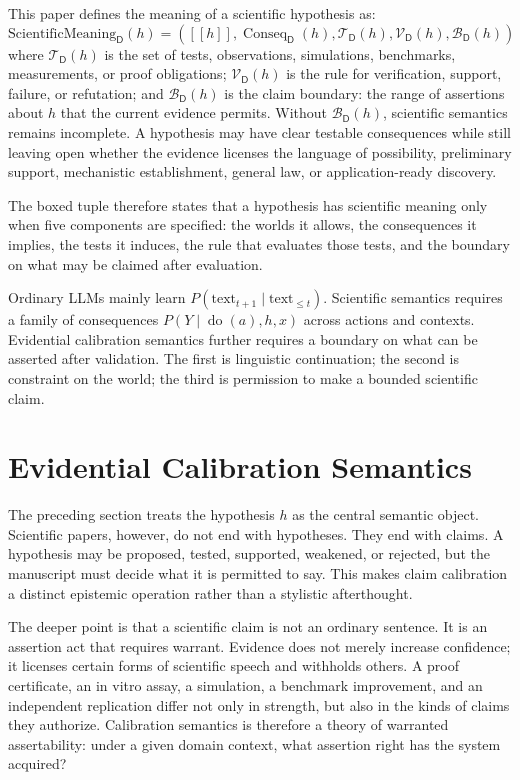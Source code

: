 \documentclass[11pt,a4paper]{article}
\newcommand{\doop}{\operatorname{do}}
\newcommand{\Conseq}{\operatorname{Conseq}}
\newcommand{\denote}[1]{\left[\!\left[#1\right]\!\right]}
\newcommand{\Dom}{\mathsf{D}}
\begin{document}
This paper defines the meaning of a scientific hypothesis as:
\begin{equation}
\boxed{
\mathrm{ScientificMeaning}_{\Dom}(h)=
\left(
\denote{h},
\Conseq_{\Dom}(h),
\mathcal{T}_{\Dom}(h),
\mathcal{V}_{\Dom}(h),
\mathcal{B}_{\Dom}(h)
\right)
}
\end{equation}
where $\mathcal{T}_{\Dom}(h)$ is the set of tests, observations, simulations, benchmarks, measurements, or proof obligations; $\mathcal{V}_{\Dom}(h)$ is the rule for verification, support, failure, or refutation; and $\mathcal{B}_{\Dom}(h)$ is the claim boundary: the range of assertions about $h$ that the current evidence permits. Without $\mathcal{B}_{\Dom}(h)$, scientific semantics remains incomplete. A hypothesis may have clear testable consequences while still leaving open whether the evidence licenses the language of possibility, preliminary support, mechanistic establishment, general law, or application-ready discovery.

The boxed tuple therefore states that a hypothesis has scientific meaning only when five components are specified: the worlds it allows, the consequences it implies, the tests it induces, the rule that evaluates those tests, and the boundary on what may be claimed after evaluation.

Ordinary LLMs mainly learn $P(\mathrm{text}_{t+1}\mid \mathrm{text}_{\leq t})$. Scientific semantics requires a family of consequences $P(Y\mid \doop(a),h,x)$ across actions and contexts. Evidential calibration semantics further requires a boundary on what can be asserted after validation. The first is linguistic continuation; the second is constraint on the world; the third is permission to make a bounded scientific claim.

\section{Evidential Calibration Semantics}

The preceding section treats the hypothesis $h$ as the central semantic object. Scientific papers, however, do not end with hypotheses. They end with claims. A hypothesis may be proposed, tested, supported, weakened, or rejected, but the manuscript must decide what it is permitted to say. This makes claim calibration a distinct epistemic operation rather than a stylistic afterthought.

The deeper point is that a scientific claim is not an ordinary sentence. It is an assertion act that requires warrant. Evidence does not merely increase confidence; it licenses certain forms of scientific speech and withholds others. A proof certificate, an in vitro assay, a simulation, a benchmark improvement, and an independent replication differ not only in strength, but also in the kinds of claims they authorize. Calibration semantics is therefore a theory of warranted assertability: under a given domain context, what assertion right has the system acquired?
\end{document}

